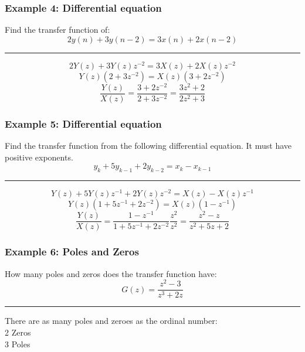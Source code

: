 \subsubsection{Example 4: Differential equation}
Find the transfer function of:
$$2y(n)+3y(n-2)=3x(n)+2x(n-2)$$

\rule{\textwidth}{0.5pt}

$$2Y(z)+3Y(z)z^{-2}=3X(z)+2X(z)z^{-2}$$
$$Y(z)(2+3z^{-2})=X(z)(3+2z^{-2})$$
$$\frac{Y(z)}{X(z)}=\frac{3+2z^{-2}}{2+3z^{-2}}=\frac{3z^2+2}{2z^2+3}$$
\subsubsection{Example 5: Differential equation}
Find the transfer function from the following differential equation. It must have positive exponents.
$$y_k+5y_{k-1}+2y_{k-2}=x_k-x_{k-1}$$

\rule{\textwidth}{0.5pt}

$$Y(z)+5Y(z)z^{-1}+2Y(z)z^{-2}=X(z)-X(z)z^{-1}$$
$$Y(z)(1+5z^{-1}+2z^{-2})=X(z)(1-z^{-1})$$
$$\frac{Y(z)}{X(z)}=\frac{1-z^{-1}}{1+5z^{-1}+2z^{-2}}\frac{z^2}{z^2}=\frac{z^2-z}{z^2+5z+2}$$

\subsubsection{Example 6: Poles and Zeros}
How many poles and zeros does the transfer function have:
$$G(z)=\frac{z^2-3}{z^3+2z}$$

\rule{\textwidth}{0.5pt}

There are as many poles and zeroes as the ordinal number:\\
2 Zeros\\
3 Poles

